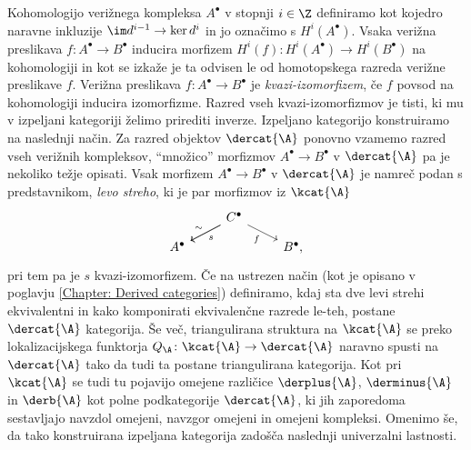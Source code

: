 Kohomologijo verižnega kompleksa $A^\bullet$ v stopnji $i \in \Z$ definiramo kot kojedro naravne inkluzije $\im d^{i-1} \to \ker d^i$ in jo označimo s $H^i(A^\bullet)$. Vsaka verižna preslikava ${f \colon A^\bullet \to B^\bullet}$ inducira morfizem $H^i(f) \colon H^i(A^\bullet) \to H^i(B^\bullet)$ na kohomologiji in kot se izkaže je ta odvisen le od homotopskega razreda verižne preslikave $f$. Verižna preslikava $f \colon A^\bullet \to B^\bullet$ je \emph{kvazi-izomorfizem}, če $f$ povsod na kohomologiji inducira izomorfizme. Razred vseh kvazi-izomorfizmov je tisti, ki mu v izpeljani kategoriji želimo prirediti inverze. Izpeljano kategorijo konstruiramo na naslednji način. Za razred objektov $\dercat{\A}$ ponovno vzamemo razred vseh verižnih kompleksov, ``množico'' morfizmov $A^\bullet \to B^\bullet$ v $\dercat{\A}$ pa je nekoliko težje opisati. Vsak morfizem $A^\bullet \to B^\bullet$ v $\dercat{\A}$ je namreč podan s predstavnikom, \ti \emph{levo streho}, ki je par morfizmov iz $\kcat{\A}$
\begin{equation*}
    \begin{tikzcd}[row sep = small, column sep = small]
	&& C^\bullet \\
	A^\bullet &&&& B^\bullet,
	\arrow["s", from=1-3, to=2-1]
	\arrow["\sim"', from=1-3, to=2-1]
	\arrow["f"', from=1-3, to=2-5]
    \end{tikzcd}
\end{equation*}
pri tem pa je $s$ kvazi-izomorfizem. Če na ustrezen način (kot je opisano v poglavju \ref{Chapter: Derived categories}) definiramo, kdaj sta dve levi strehi ekvivalentni in kako komponirati ekvivalenčne razrede le-teh, postane $\dercat{\A}$ kategorija. Še več, triangulirana struktura na $\kcat{\A}$ se preko lokalizacijskega funktorja $Q_\A \colon \kcat{\A} \to \dercat{\A}$ naravno spusti na $\dercat{\A}$ tako da tudi ta postane triangulirana kategorija. Kot pri $\kcat{\A}$ se tudi tu pojavijo omejene različice $\derplus{\A}$, $\derminus{\A}$ in $\derb{\A}$ kot polne podkategorije $\dercat{\A}$, ki jih zaporedoma sestavljajo navzdol omejeni, navzgor omejeni in omejeni kompleksi. Omenimo še, da tako konstruirana izpeljana kategorija zadošča naslednji univerzalni lastnosti. 

